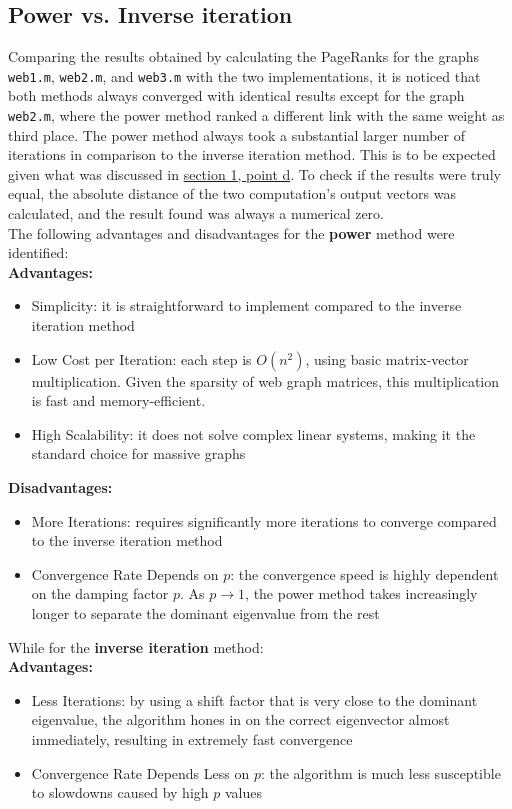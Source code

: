 \documentclass[unicode,11pt,a4paper,oneside,numbers=endperiod,openany]{scrartcl}
\begin{document}
\subsection{Power vs. Inverse iteration}
Comparing the results obtained by calculating the PageRanks for the graphs \texttt{web1.m}, \texttt{web2.m}, and \texttt{web3.m} with the two implementations, it is noticed that both methods always converged with identical results except for the graph \texttt{web2.m}, where the power method ranked a different link with the same weight as third place. The power method always took a substantial larger number of iterations in comparison to the inverse iteration method. This is to be expected given what was discussed in \hyperref[qst:perf]{section 1, point d}. To check if the results were truly equal, the absolute distance of the two computation's output vectors was calculated, and the result found was always a numerical zero.
\\[2em]
The following advantages and disadvantages for the \textbf{power} method were identified:
\\[.5em]
\textbf{Advantages:}
\begin{itemize}
    \item Simplicity: it is straightforward to implement compared to the inverse iteration method
    \item Low Cost per Iteration: each step is $O(n^2)$, using basic matrix-vector multiplication. Given the sparsity of web graph matrices, this multiplication is fast and memory-efficient.
    \item High Scalability: it does not solve complex linear systems, making it the standard choice for massive graphs
\end{itemize}
\textbf{Disadvantages:}
\begin{itemize}
    \item More Iterations: requires significantly more iterations to converge compared to the inverse iteration method
    \item Convergence Rate Depends on $p$: the convergence speed is highly dependent on the damping factor $p$. As $p \to 1$, the power method takes increasingly longer to separate the dominant eigenvalue from the rest
\end{itemize}
\vspace{1.5em}
While for the \textbf{inverse iteration} method:
\\[.5em]
\textbf{Advantages:}
\begin{itemize}
    \item Less Iterations: by using a shift factor that is very close to the dominant eigenvalue, the algorithm hones in on the correct eigenvector almost immediately, resulting in extremely fast convergence
    \item Convergence Rate Depends Less on $p$: the algorithm is much less susceptible to slowdowns caused by high $p$ values
\end{itemize}
\end{document}
